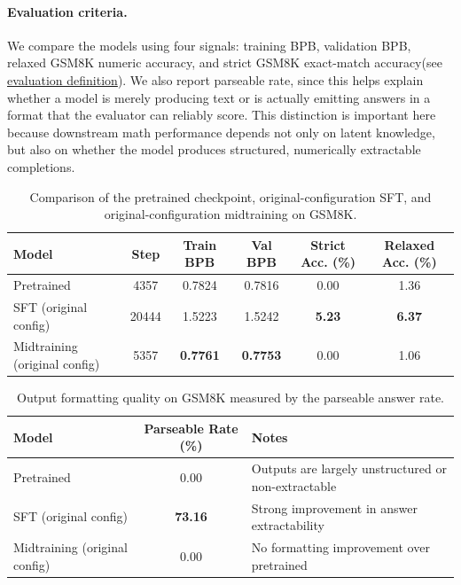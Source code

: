 \paragraph{Evaluation criteria.}
We compare the models using four signals: training BPB, validation BPB, relaxed GSM8K numeric accuracy, and strict GSM8K exact-match accuracy(see \hyperref[sec:gsm8k_eval_def]{evaluation definition}). We also report parseable rate, since this helps explain whether a model is merely producing text or is actually emitting answers in a format that the evaluator can reliably score. This distinction is important here because downstream math performance depends not only on latent knowledge, but also on whether the model produces structured, numerically extractable completions.

\begin{table}[H]
\centering
\caption{Comparison of the pretrained checkpoint, original-configuration SFT, and original-configuration midtraining on GSM8K.}
\label{tab:p2_original_compare}
\begin{tabular}{l
                S[table-format=5.0]
                S[table-format=1.4]
                S[table-format=1.4]
                S[table-format=2.2]
                S[table-format=2.2]}
\toprule
\textbf{Model} & \textbf{Step} & \textbf{Train BPB} & \textbf{Val BPB} & \textbf{Strict Acc. (\%)} & \textbf{Relaxed Acc. (\%)} \\
\midrule
Pretrained & 4357  & 0.7824 & 0.7816 & 0.00 & 1.36 \\
SFT (original config) & 20444 & 1.5223 & 1.5242 & \bfseries 5.23 & \bfseries 6.37 \\
Midtraining (original config) & 5357 & \bfseries 0.7761 & \bfseries 0.7753 & 0.00 & 1.06 \\
\bottomrule
\end{tabular}
\end{table}


\begin{table}[H]
\centering
\caption{Output formatting quality on GSM8K measured by the parseable answer rate.}
\label{tab:p2_parseable}
\begin{tabular}{l S[table-format=2.2] l}
\toprule
\textbf{Model} & \textbf{Parseable Rate (\%)} & \textbf{Notes} \\
\midrule
Pretrained & 0.00 & Outputs are largely unstructured or non-extractable \\
SFT (original config) & \bfseries 73.16 & Strong improvement in answer extractability \\
Midtraining (original config) & 0.00 & No formatting improvement over pretrained \\
\bottomrule
\end{tabular}
\end{table}

